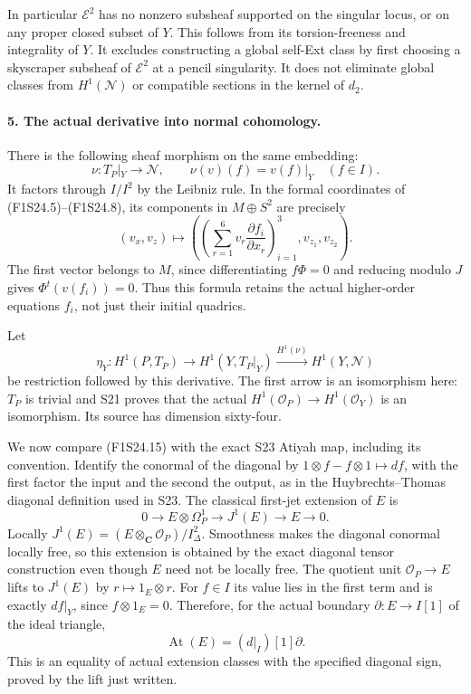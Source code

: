 In particular $\mathscr E^2$ has no nonzero subsheaf supported
on the singular locus, or on any proper closed subset of $Y$.
This follows from its torsion-freeness and integrality of $Y$.
It excludes constructing a global self-Ext class by first choosing
a skyscraper subsheaf of $\mathscr E^2$ at a pencil singularity.
It does not eliminate global classes from $H^1(\mathscr N)$
or compatible sections in the kernel of $d_2$.

\paragraph{5. The actual derivative into normal cohomology.}
There is the following sheaf morphism on the same embedding:
\[
 \nu:T_P|_Y\longrightarrow\mathscr N,
       \qquad\nu(v)(f)=v(f)|_Y\quad(f\in I).
 \tag{F1S24.13}
\]
It factors through $I/I^2$ by the Leibniz rule. In the formal
coordinates of (F1S24.5)--(F1S24.8), its components in
$M\oplus S^2$ are precisely
\[
 (v_x,v_z)\longmapsto
     \left(\left(\sum_{r=1}^6v_r\frac{\partial f_i}{\partial x_r}
                                          \right)_{i=1}^3,
                    v_{z_1},v_{z_2}\right).
 \tag{F1S24.14}
\]
The first vector belongs to $M$, since differentiating $f\Phi=0$
and reducing modulo $J$ gives $\Phi^t(v(f_i))=0$.
Thus this formula retains the actual higher-order equations $f_i$,
not just their initial quadrics.

Let
\[
 \eta_Y:H^1(P,T_P)\longrightarrow H^1(Y,T_P|_Y)
                     \xrightarrow{H^1(\nu)}H^1(Y,\mathscr N)
 \tag{F1S24.15}
\]
be restriction followed by this derivative. The first arrow is
an isomorphism here: $T_P$ is trivial and S21 proves that the
actual $H^1(\mathcal O_P)\to H^1(\mathcal O_Y)$ is an
isomorphism. Its source has dimension sixty-four.

We now compare (F1S24.15) with the exact S23 Atiyah map, including
its convention. Identify the conormal of the diagonal by
$1\otimes f-f\otimes1\mapsto df$, with the first factor
the input and the second the output, as in the Huybrechts--Thomas
diagonal definition used in S23. The classical first-jet extension
of $E$ is
\[
 0\longrightarrow E\otimes\Omega_P^1
         \longrightarrow J^1(E)\longrightarrow E\longrightarrow0.
 \tag{F1S24.16}
\]
Locally $J^1(E)=(E\otimes_{\mathbf C}\mathcal O_P)/I_\Delta^2$.
Smoothness makes the diagonal conormal locally free, so this
extension is obtained by the exact diagonal tensor construction
even though $E$ need not be locally free. The quotient unit
$\mathcal O_P\to E$ lifts to $J^1(E)$ by $r\mapsto1_E\otimes r$.
For $f\in I$ its value lies in the first term and is exactly
$df|_Y$, since $f\otimes1_E=0$. Therefore, for the actual
boundary $\partial:E\to I[1]$ of the ideal triangle,
\[
 \operatorname{At}(E)=(d|_I)[1]\partial.
 \tag{F1S24.17}
\]
This is an equality of actual extension classes with the specified
diagonal sign, proved by the lift just written.

